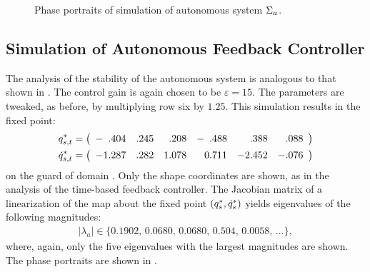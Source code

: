 \begin{figure*}[tp!]
  \centering
  \caption{Phase portraits of simulation of autonomous system $\Sigma_{a}$.}
  \label{fig:pp-a}
\end{figure*} 


\subsection{Simulation of Autonomous Feedback Controller}

The analysis of the stability of the autonomous system is analogous to that
shown in .
%
The control gain is again chosen to be $\varepsilon = 15$.
%
The parameters are tweaked, as before, by multiplying row six by $1.25$.
%
This simulation results in the fixed point:
%
\begin{align*}
  q^{*}_{s,t} &=
  \left(\begin{array}{r r r r r r}
      -\hphantom{1}.404 & .245 & \hphantom{1}.208 & -\hphantom{0}.488 &
      \hphantom{-2}.388 & \hphantom{-}.088
  \end{array}\right)\\
  \dot{q}^{*}_{s,t} &=
  \left(\begin{array}{r r r r r r}
    -1.287 & .282 & 1.078 & \hphantom{-}0.711 & -2.452 & -.076
  \end{array}\right)
\end{align*}
on the guard of domain {\DC}.
%
Only the shape coordinates are shown, as in the analysis of the time-based
feedback controller.
%
The Jacobian matrix of a linearization of the \Poincare{} map about the fixed
point $(q^{*}_{s}, \dot{q}^{*}_{s})$ yields eigenvalues of the following
magnitudes:
%
\begin{align*}
  |\lambda_{a}| \in \{0.1902, \, 0.0680, \, 0.0680, \, 0.504, \, 0.0058, \,
  \ldots\},
\end{align*}
where, again, only the five eigenvalues with the largest magnitudes are shown.
%
The phase portraits are shown in .
